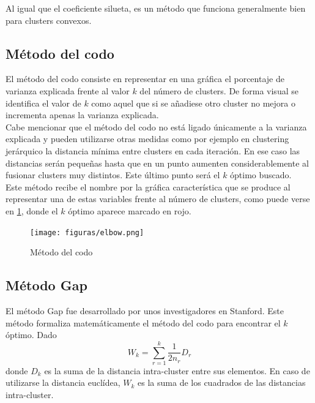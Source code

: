 Al igual que el coeficiente silueta, es un método que funciona generalmente bien para clusters convexos.

\subsection{Método del codo}
El método del codo consiste en representar en una gráfica el porcentaje de varianza explicada frente al valor $k$ del número de clusters. De forma visual se identifica el valor de $k$ como aquel que si se a\~nadiese otro cluster no mejora o incrementa apenas la varianza explicada. \\

Cabe mencionar que el método del codo no está ligado únicamente a la varianza explicada y pueden utilizarse otras medidas como por ejemplo en clustering jerárquico la distancia mínima entre clusters en cada iteración. En ese caso las distancias serán peque\~nas hasta que en un punto aumenten considerablemente al fusionar clusters muy distintos. Este último punto será el $k$ óptimo buscado. \\

Este método recibe el nombre por la gráfica característica que se produce al representar una de estas variables frente al número de clusters, como puede verse en \ref{fig_elbow}, donde el $k$ óptimo aparece marcado en rojo. \\

\begin{figure}[ht!]
\begin{center}
\texttt{[image: figuras/elbow.png]}
\end{center}
\caption{Método del codo}
\label{fig_elbow}
\end{figure}

\subsection{Método Gap}
El método Gap fue desarrollado por unos investigadores en Stanford\cite{gap:2001}. Este método formaliza matemáticamente el método del codo para encontrar el $k$ óptimo. Dado 
\begin{equation}
W_k = \sum_{r=1}^{k}\frac{\displaystyle 1}{\displaystyle 2n_r}D_r \nonumber
\end{equation}
donde $D_k$ es la suma de la distancia intra-cluster entre sus elementos. En caso de utilizarse la distancia euclídea, $W_k$ es la suma de los cuadrados de las distancias intra-cluster. \\

